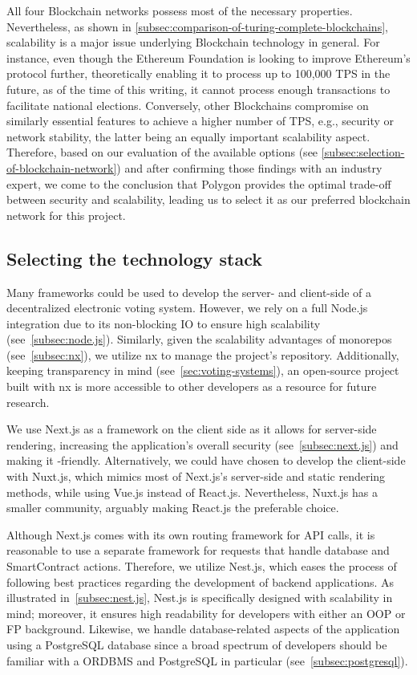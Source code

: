 All four \gls{Blockchain} networks possess most of the necessary properties.
Nevertheless, as shown in \cref{subsec:comparison-of-turing-complete-blockchains}, scalability is a major issue underlying \gls{Blockchain} technology in general.
For instance, even though the Ethereum Foundation is looking to improve Ethereum's protocol further, theoretically enabling it to process up to 100,000 \gls{TPS} in the future, as of the time of this writing, it cannot process enough transactions to facilitate national elections.
Conversely, other \glspl{Blockchain} compromise on similarly essential features to achieve a higher number of \gls{TPS}, e.g., security or network stability, the latter being an equally important scalability aspect.
Therefore, based on our evaluation of the available options (see \cref{subsec:selection-of-blockchain-network}) and after confirming those findings with an industry expert, we come to the conclusion that Polygon provides the optimal trade-off between security and scalability, leading us to select it as our preferred blockchain network for this project.

\subsection{Selecting the technology stack}\label{subsec:selection-of-tech-stack}

Many frameworks could be used to develop the server- and client-side of a decentralized electronic voting system.
However, we rely on a full Node.js integration due to its non-blocking \gls{IO} to ensure high scalability (see~\cref{subsec:node.js}).
Similarly, given the scalability advantages of monorepos (see~\cref{subsec:nx}), we utilize nx to manage the project's repository.
Additionally, keeping transparency in mind (see~\cref{sec:voting-systems}), an open-source project built with nx is more accessible to other developers as a resource for future research.

We use Next.js as a framework on the client side as it allows for server-side rendering, increasing the application's overall security (see~\cref{subsec:next.js}) and making it -friendly.
Alternatively, we could have chosen to develop the client-side with Nuxt.js, which mimics most of Next.js's server-side and static rendering methods, while using Vue.js instead of React.js.
Nevertheless, Nuxt.js has a smaller community, arguably making React.js the preferable choice.

Although Next.js comes with its own routing framework for API calls, it is reasonable to use a separate framework for requests that handle database and \gls{SmartContract} actions.
Therefore, we utilize Nest.js, which eases the process of following best practices regarding the development of backend applications.
As illustrated in~\cref{subsec:nest.js}, Nest.js is specifically designed with scalability in mind;
moreover, it ensures high readability for developers with either an \gls{OOP} or \gls{FP} background.
Likewise, we handle  database-related aspects of the application using a PostgreSQL database since a broad spectrum of developers should be familiar with a \gls{ORDBMS} and PostgreSQL in particular (see~\cref{subsec:postgresql}).

